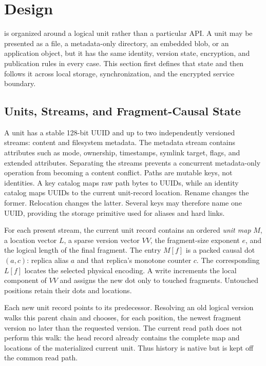 \section{Design}
\label{sec:design}

\sfs{} is organized around a logical unit rather than a particular API.  A unit
may be presented as a file, a metadata-only directory, an embedded blob, or an
application object, but it has the same identity, version state, encryption,
and publication rules in every case.  This section first defines that state and
then follows it across local storage, synchronization, and the encrypted service
boundary.

\subsection{Units, Streams, and Fragment-Causal State}
\label{subsec:mvcc}

A unit has a stable 128-bit UUID and up to two independently versioned streams:
content and filesystem metadata.  The metadata stream contains attributes such
as mode, ownership, timestamps, symlink target, flags, and extended attributes.
Separating the streams prevents a concurrent metadata-only operation from
becoming a content conflict.  Paths are mutable keys, not identities.  A key
catalog maps raw path bytes to UUIDs, while an identity catalog maps UUIDs to
the current unit-record location.  Rename changes the former.  Relocation
changes the latter.  Several keys may therefore name one UUID, providing the
storage primitive used for aliases and hard links.

For each present stream, the current unit record contains an ordered
\emph{unit map} $M$, a location vector $L$, a sparse version vector $VV$, the
fragment-size exponent $e$, and the logical length of the final fragment.  The
entry $M[f]$ is a packed causal dot $(a,c)$: replica alias $a$ and that replica's
monotone counter $c$.  The corresponding $L[f]$ locates the selected physical
encoding.  A write increments the local component of $VV$ and assigns the new
dot only to touched fragments.  Untouched positions retain their dots and
locations.

Each new unit record points to its predecessor.  Resolving an old logical
version walks this parent chain and chooses, for each position, the newest
fragment version no later than the requested version.  The current read path
does not perform this walk: the head record already contains the complete map
and locations of the materialized current unit.  Thus history is native but is
kept off the common read path.

